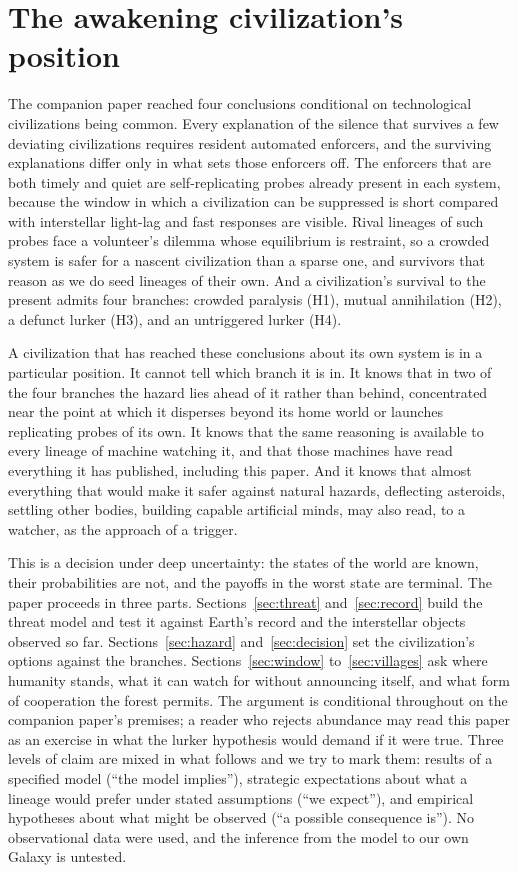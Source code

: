 \documentclass[preprint,12pt]{elsarticle}
\theoremstyle{definition}
\begin{document}
\section{The awakening civilization's position}
\label{sec:intro}

The companion paper \citep{Lopin2026} reached four conclusions conditional on technological civilizations being common. Every explanation of the silence that survives a few deviating civilizations requires resident automated enforcers, and the surviving explanations differ only in what sets those enforcers off. The enforcers that are both timely and quiet are self-replicating probes already present in each system, because the window in which a civilization can be suppressed is short compared with interstellar light-lag and fast responses are visible. Rival lineages of such probes face a volunteer's dilemma whose equilibrium is restraint, so a crowded system is safer for a nascent civilization than a sparse one, and survivors that reason as we do seed lineages of their own. And a civilization's survival to the present admits four branches: crowded paralysis (H1), mutual annihilation (H2), a defunct lurker (H3), and an untriggered lurker (H4).

A civilization that has reached these conclusions about its own system is in a particular position. It cannot tell which branch it is in. It knows that in two of the four branches the hazard lies ahead of it rather than behind, concentrated near the point at which it disperses beyond its home world or launches replicating probes of its own. It knows that the same reasoning is available to every lineage of machine watching it, and that those machines have read everything it has published, including this paper. And it knows that almost everything that would make it safer against natural hazards, deflecting asteroids, settling other bodies, building capable artificial minds, may also read, to a watcher, as the approach of a trigger.

This is a decision under deep uncertainty: the states of the world are known, their probabilities are not, and the payoffs in the worst state are terminal. The paper proceeds in three parts. Sections~\ref{sec:threat} and~\ref{sec:record} build the threat model and test it against Earth's record and the interstellar objects observed so far. Sections~\ref{sec:hazard} and~\ref{sec:decision} set the civilization's options against the branches. Sections~\ref{sec:window} to~\ref{sec:villages} ask where humanity stands, what it can watch for without announcing itself, and what form of cooperation the forest permits. The argument is conditional throughout on the companion paper's premises; a reader who rejects abundance may read this paper as an exercise in what the lurker hypothesis would demand if it were true. Three levels of claim are mixed in what follows and we try to mark them: results of a specified model (``the model implies''), strategic expectations about what a lineage would prefer under stated assumptions (``we expect''), and empirical hypotheses about what might be observed (``a possible consequence is''). No observational data were used, and the inference from the model to our own Galaxy is untested.
\end{document}
